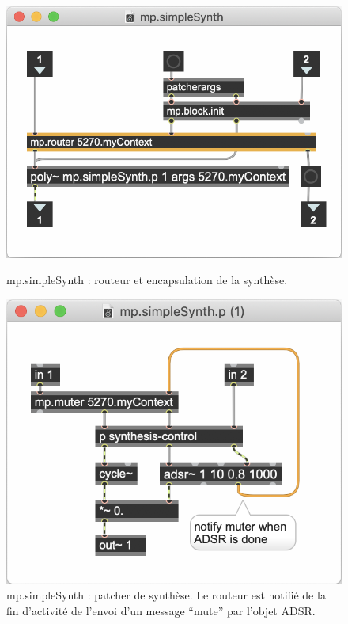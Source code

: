 \begin{figure}[!htbp]
	\captionsetup{format=plain}%
	\centering
	\begin{minipage}[t]{0.510\textwidth}
		\includegraphics[width=\linewidth]{gfx/04_algorithms/MP-reallySimpleSynth.png}
		\caption[mp.simpleSynth : encapsulation de la synthèse]{mp.simpleSynth : routeur et encapsulation de la synthèse.}
		\label{fig:algorithms:MP-simpleSynth}
	\end{minipage}
	\hspace{.02\linewidth}
	\begin{minipage}[t]{0.450\textwidth}
	  	\includegraphics[width=\linewidth]{gfx/04_algorithms/MP-reallySimpleSynth-inside.png}
		\caption[mp.simpleSynth : patcher de synthèse]{mp.simpleSynth : patcher de synthèse. Le routeur est notifié de la fin d'activité de l'envoi d'un message ``mute'' par l'objet ADSR.}
		\label{fig:algorithms:MP-simpleSynth-inside}
	\end{minipage}
\end{figure}


